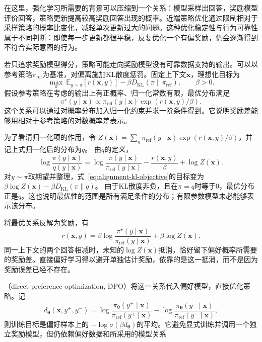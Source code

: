 在这里，强化学习所需要的背景可以压缩到一个关系：模型采样出回答，奖励模型评价回答，策略更新提高较高奖励回答出现的概率。近端策略优化通过限制相对于采样策略的概率比变化，减轻单次更新过大的问题。这种优化稳定性与行为可靠性属于不同判断：即使每一步更新都很平稳，反复优化一个有偏奖励，仍会逐渐得到不符合实际意图的行为。

若只追求奖励模型得分，策略可能走向奖励模型没有可靠数据支持的输出。可以以参考策略$\pi_{\mathrm{ref}}$为基准，对偏离施加KL散度惩罚。固定上下文$\bm{x}$，理想化目标为
\begin{equation}
 \max_\pi\
 \mathbb E_{y\sim\pi}[r(\bm{x},y)]
 -\beta D_{\mathrm{KL}}(\pi\|\pi_{\mathrm{ref}}),
 \qquad \beta>0.
 \label{eq:alignment-kl-objective}
\end{equation}
假设参考策略在考虑的输出上有正概率、归一化常数有限，最优分布满足
\[
 \pi^\star(y\mid\bm{x})
 \propto\pi_{\mathrm{ref}}(y\mid\bm{x})
              \exp(r(\bm{x},y)/\beta).
\]
这个关系可以通过对概率分布加入归一化约束并求一阶条件得到。它说明奖励差能够用相对于参考策略的对数概率差表示。

为了看清归一化项的作用，令
$Z(\bm{x})=\sum_y\pi_{\mathrm{ref}}(y\mid\bm{x})
\exp(r(\bm{x},y)/\beta)$，并记上式归一化后的分布为$q$。
由$q$的定义，
\[
 \log\frac{\pi(y\mid\bm{x})}{q(y\mid\bm{x})}
 =\log\frac{\pi(y\mid\bm{x})}{\pi_{\mathrm{ref}}(y\mid\bm{x})}
  -\frac{r(\bm{x},y)}{\beta}+\log Z(\bm{x}).
\]
对$y\sim\pi$取期望并整理，式~\eqref{eq:alignment-kl-objective}的目标变为
$\beta\log Z(\bm{x})-\beta D_{\mathrm{KL}}(\pi\|q)$。
由于KL散度非负，且在$\pi=q$时等于0，最优分布正是$q$。这也说明最优性的范围是所有满足条件的分布；有限参数模型未必能够表示该分布。

将最优关系反解为奖励，有
\begin{equation}
 r(\bm{x},y)
 =\beta\log\frac{\pi^\star(y\mid\bm{x})}
                     {\pi_{\mathrm{ref}}(y\mid\bm{x})}
   +\beta\log Z(\bm{x}).
 \label{eq:alignment-reward-policy}
\end{equation}
同一上下文的两个回答相减时，未知的$\log Z(\bm{x})$抵消，恰好留下偏好概率所需要的奖励差。直接偏好学习得以避开单独估计奖励，依靠的是这一抵消，而不是因为奖励误差已经不存在。

（direct preference optimization, DPO）将这一关系代入偏好模型，直接优化策略。记
\[
 d_{\bm{\theta}}(\bm{x},y^+,y^-)
 =\log\frac{\pi_{\bm{\theta}}(y^+\mid\bm{x})}
              {\pi_{\mathrm{ref}}(y^+\mid\bm{x})}
 -\log\frac{\pi_{\bm{\theta}}(y^-\mid\bm{x})}
              {\pi_{\mathrm{ref}}(y^-\mid\bm{x})},
\]
则训练目标是偏好样本上的
$-\log\sigma(\beta d_{\bm{\theta}})$的平均。它避免显式训练并调用一个独立奖励模型，但仍依赖偏好数据和所采用的模型关系

